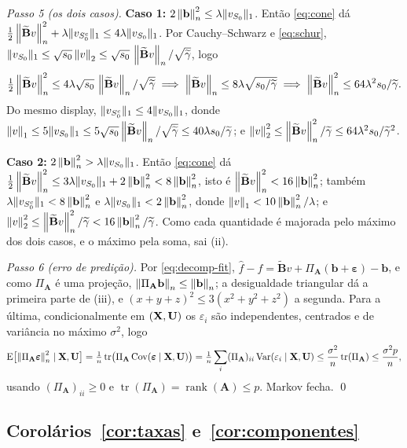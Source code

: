 \documentclass[11pt,a4paper]{article}
\newcommand{\Amat}{\mathbf{A}}
\newcommand{\Bmat}{\mathbf{B}}
\newcommand{\Btil}{\widetilde{\Bmat}}
\newcommand{\PA}{\Pi_{\Amat}}
\newcommand{\bveps}{\boldsymbol{\varepsilon}}
\newcommand{\bb}{\mathbf{b}}
\newcommand{\gtil}{\widetilde{\gamma}}
\begin{document}
\emph{Passo 5 (os dois casos).} \textbf{Caso 1:}
$2\normn{\bb}^{2} \le \pen\lVert v_{\Szero}\rVert_{1}$. Então \eqref{eq:cone}
dá $\tfrac12\normn{\Btil v}^{2} + \pen\lVert v_{\Szero^{c}}\rVert_{1} \le
4\pen\lVert v_{\Szero}\rVert_{1}$. Por Cauchy--Schwarz e
\eqref{eq:schur}, $\lVert v_{\Szero}\rVert_{1} \le \sqrt{s_{0}}\norm{v}_{2}
\le \sqrt{s_{0}}\,\normn{\Btil v}/\sqrt{\gtil}$, logo
\[
  \tfrac12\normn{\Btil v}^{2} \le 4\pen\sqrt{s_{0}}\,\normn{\Btil v}/\sqrt{\gtil}
  \;\Longrightarrow\;
  \normn{\Btil v} \le 8\pen\sqrt{s_{0}/\gtil}
  \;\Longrightarrow\;
  \normn{\Btil v}^{2} \le 64\pen^{2}s_{0}/\gtil .
\]
Do mesmo display, $\lVert v_{S_{0}^{c}}\rVert_{1} \le 4\lVert v_{S_{0}}\rVert_{1}$,
donde $\norm{v}_{1} \le 5\lVert v_{\Szero}\rVert_{1} \le
5\sqrt{s_{0}}\normn{\Btil v}/\sqrt{\gtil} \le 40\pen s_{0}/\gtil$; e
$\norm{v}_{2}^{2} \le \normn{\Btil v}^{2}/\gtil \le 64\pen^{2}s_{0}/\gtil^{2}$.

\textbf{Caso 2:} $2\normn{\bb}^{2} > \pen\lVert v_{\Szero}\rVert_{1}$. Então
\eqref{eq:cone} dá $\tfrac12\normn{\Btil v}^{2} \le 3\pen\lVert
v_{\Szero}\rVert_{1} + 2\normn{\bb}^{2} < 8\normn{\bb}^{2}$, isto é
$\normn{\Btil v}^{2} < 16\normn{\bb}^{2}$; também
$\pen\lVert v_{\Szero^{c}}\rVert_{1} < 8\normn{\bb}^{2}$ e
$\pen\lVert v_{\Szero}\rVert_{1} < 2\normn{\bb}^{2}$, donde
$\norm{v}_{1} < 10\normn{\bb}^{2}/\pen$; e
$\norm{v}_{2}^{2} \le \normn{\Btil v}^{2}/\gtil < 16\normn{\bb}^{2}/\gtil$.
Como cada quantidade é majorada pelo máximo dos dois casos, e o máximo pela
soma, sai (ii).

\emph{Passo 6 (erro de predição).} Por \eqref{eq:decomp-fit},
$\widehat{f} - f = \Btil v + \PA(\bb+\bveps) - \bb$, e como $\PA$ é uma
projeção, $\normn{\PA\bb} \le \normn{\bb}$; a desigualdade triangular dá a
primeira parte de (iii), e $(x+y+z)^{2} \le 3(x^{2}+y^{2}+z^{2})$ a segunda.
Para a última, condicionalmente em $(\mathbf{X},\mathbf{U})$ os $\varepsilon_{i}$ são
independentes, centrados e de variância no máximo $\sigma^{2}$, logo
\[
  \E\bigl[\normn{\PA\bveps}^{2} \mid \bX,\bU\bigr]
  = \tfrac1n\operatorname{tr}\bigl(\PA\operatorname{Cov}(\bveps\mid\bX,\bU)\bigr)
  = \tfrac1n\sum_{i}(\PA)_{ii}\operatorname{Var}(\varepsilon_{i}\mid\bX,\bU)
  \le \frac{\sigma^{2}}{n}\operatorname{tr}(\PA) \le \frac{\sigma^{2}p}{n},
\]
usando $(\PA)_{ii} \ge 0$ e $\operatorname{tr}(\PA) = \operatorname{rank}(\Amat)
\le p$. Markov fecha. \qed

\subsection*{Corolários~\ref{cor:taxas} e~\ref{cor:componentes}}
\end{document}
